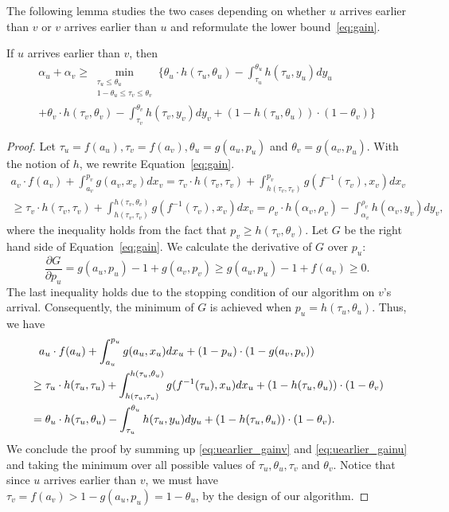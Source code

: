 The following lemma studies the two cases depending on whether $u$ arrives earlier than $v$ or $v$ arrives earlier than $u$ and reformulate the lower bound~\eqref{eq:gain}.

\begin{lemma}
\label{lem:uearlier}
If $u$ arrives earlier than $v$, then
\begin{multline}
\label{eq:uearlier}
\alpha_u + \alpha_v \ge \min_{\substack{\tau_u \le \theta_u \\ 1-\theta_u \le \tau_v \le \theta_v}} \bigg\{ \theta_u \cdot h(\tau_u, \theta_u) - \int_{\tau_u}^{\theta_u} h(\tau_u, y_u) dy_u \\
+ \theta_v \cdot h(\tau_v, \theta_v) - \int_{\tau_v}^{\theta_v} h(\tau_v, y_v) dy_v + (1-h(\tau_u, \theta_u)) \cdot (1-\theta_v) \bigg\}
\end{multline}
\end{lemma}
\begin{proof}
Let $\tau_u = f(a_u), \tau_v= f(a_v), \theta_u = g(a_u, p_u)$ and $\theta_v = g(a_v, p_u)$. 
With the notion of $h$, we rewrite Equation~\eqref{eq:gain}.
\begin{multline}
\label{eq:uearlier_gainv}
a_v \cdot f(a_v) + \int_{a_v}^{p_v} g(a_v, x_v) dx_v = \tau_v \cdot h(\tau_v,\tau_v) + \int_{h(\tau_v,\tau_v)}^{p_v} g(f^{-1}(\tau_v), x_v) dx_v \\
\ge \tau_v \cdot h(\tau_v,\tau_v) + \int_{h(\tau_v,\tau_v)}^{h(\tau_v, \theta_v)} g(f^{-1}(\tau_v), x_v) dx_v = \rho_v \cdot h(\alpha_v, \rho_v) - \int_{\alpha_v}^{\rho_v} h(\alpha_v,y_v) dy_v,
\end{multline}
where the inequality holds from the fact that $p_v \ge h(\tau_v,\theta_v)$.
Let $G$ be the right hand side of Equation~\eqref{eq:gain}. We calculate the derivative of $G$ over $p_u$:
\[
\frac{\partial G}{\partial p_u} = g(a_u, p_u) - 1 + g(a_v, p_v) \ge g(a_u, p_u) - 1 + f(a_v) \ge 0.
\]
The last inequality holds due to the stopping condition of our algorithm on $v$'s arrival. Consequently, the minimum of $G$ is achieved when $p_u = h(\tau_u,\theta_u)$. 
Thus, we have 
\begin{align}
&\phantom{\ge} a_u \cdot f(a_u) + \int_{a_u}^{p_u} g(a_u, x_u) dx_u + (1-p_u) \cdot (1-g(a_v,p_v)) \notag \\
& \ge \tau_u \cdot h(\tau_u,\tau_u) + \int_{h(\tau_u,\tau_u)}^{h(\tau_u,\theta_u)} g(f^{-1}(\tau_u),x_u) dx_u + (1-h(\tau_u,\theta_u)) \cdot (1-\theta_v) \notag \\
& = \theta_u \cdot h(\tau_u, \theta_u) - \int_{\tau_u}^{\theta_u} h(\tau_u, y_u) dy_u + (1-h(\tau_u, \theta_u)) \cdot (1-\theta_v). \label{eq:uearlier_gainu}
\end{align}
We conclude the proof by summing up \eqref{eq:uearlier_gainv} and \eqref{eq:uearlier_gainu} and taking the minimum over all possible values of $\tau_u,\theta_u,\tau_v$ and $\theta_v$. Notice that since $u$ arrives earlier than $v$, we must have $\tau_v = f(a_v) > 1-g(a_u,p_u) = 1-\theta_u$, by the design of our algorithm.
\end{proof}

